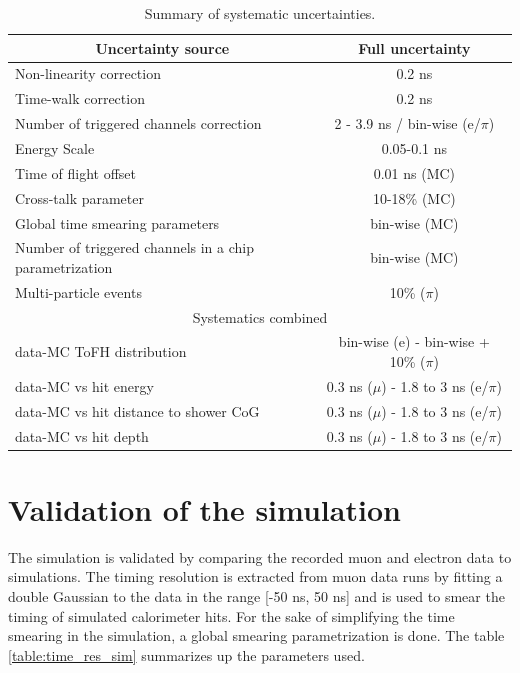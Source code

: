 \begin{table}[htb!]
	\centering
	\caption{Summary of systematic uncertainties.}
	\label{table:time_syst}
	\begin{tabular}{@{} lc @{}}
		\toprule
		\multicolumn{1}{c}{Uncertainty source} & Full uncertainty \\
		\midrule
		Non-linearity correction & 0.2 ns \\
		Time-walk correction & 0.2 ns \\
		Number of triggered channels correction & 2 - 3.9 ns / bin-wise (e/$\pi$)\\
		Energy Scale & 0.05-0.1 ns \\
		Time of flight offset & 0.01 ns (MC) \\
		Cross-talk parameter & 10-18\% (MC)\\
		Global time smearing parameters & bin-wise (MC)\\
		Number of triggered channels in a chip parametrization & bin-wise (MC)\\
		Multi-particle events & 10\% ($\pi$) \\
		\midrule
		\midrule
		\multicolumn{2}{c}{Systematics combined} \\
		\midrule
		data-MC ToFH distribution & bin-wise (e) - bin-wise + 10\% ($\pi$) \\
		data-MC vs hit energy & 0.3 ns ($\mu$) - 1.8 to 3 ns (e/$\pi$)\\
		data-MC vs hit distance to shower CoG & 0.3 ns ($\mu$) - 1.8 to 3 ns (e/$\pi$)\\
		data-MC vs hit depth & 0.3 ns ($\mu$) - 1.8 to 3 ns (e/$\pi$)\\
		\bottomrule
	\end{tabular}
\end{table}

\section{Validation of the simulation}

The simulation is validated by comparing the recorded muon and electron data to simulations. The timing resolution is extracted from muon data runs by fitting a double Gaussian to the data in the range [-50 ns, 50 ns] and is used to smear the timing of simulated calorimeter hits. For the sake of simplifying the time smearing in the simulation, a global smearing parametrization is done. The table \ref{table:time_res_sim} summarizes up the parameters used.

